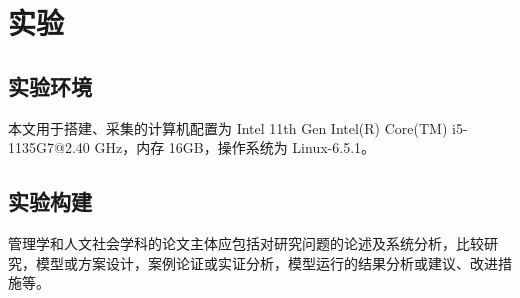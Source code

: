 \section{实验}
\label{section:experiment}
\subsection{实验环境}
本文用于搭建、采集的计算机配置为 Intel 11th Gen Intel(R) Core(TM) i5-1135G7@2.40 GHz，内存 16GB，操作系统为 Linux-6.5.1。
\subsection{实验构建}
管理学和人文社会学科的论文主体应包括对研究问题的论述及系统分析，比较研究，模型或方案设计，案例论证或实证分析，模型运行的结果分析或建议、改进措施等。
